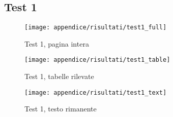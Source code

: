 \newpage
\subsection{Test 1}
\begin{figure}[H] 
    \centering
    \texttt{[image: appendice/risultati/test1\_full]} 
    \caption{Test 1, pagina intera}
    \label{img:test-0-full}
\end{figure} 
\newpage
\begin{figure}[H]  
        \centering  
        \texttt{[image: appendice/risultati/test1\_table]}  
        \caption{Test 1, tabelle rilevate}
\end{figure}
\begin{figure}[H]
        \centering  
        \texttt{[image: appendice/risultati/test1\_text]}  
        \caption{Test 1, testo rimanente}
\end{figure}%
